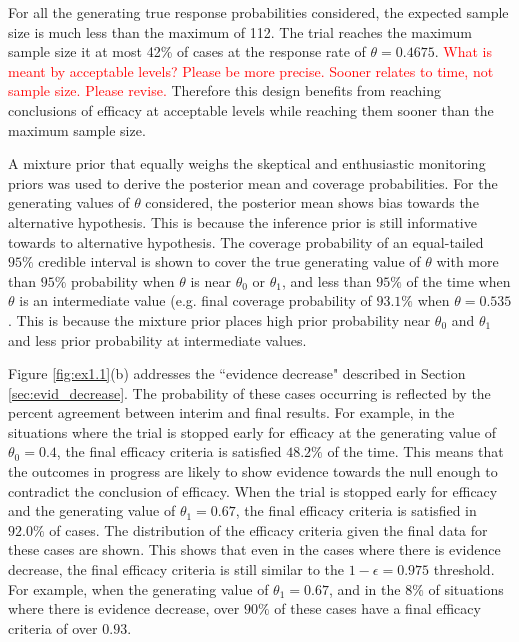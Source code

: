 \documentclass[useAMS,usenatbib,referee]{biom}
\begin{document}
For all the generating true response probabilities considered, the expected sample size is much less than the maximum of 112. The trial reaches the maximum sample size it at most 42\% of cases at the response rate of $\theta=0.4675$. 
\textcolor{red}{What is meant by acceptable levels? Please be more precise. Sooner relates to time, not sample size. Please revise.}
%
Therefore this design benefits from reaching conclusions of efficacy at acceptable levels while reaching them sooner than the maximum sample size.

A mixture prior that equally weighs the skeptical and enthusiastic monitoring priors was used to derive the posterior mean and coverage probabilities. For the generating values of $\theta$ considered, the posterior mean shows bias towards the alternative hypothesis. This is because the inference prior is still informative towards to alternative hypothesis. The coverage probability of an equal-tailed $95\%$ credible interval is shown to cover the true generating value of $\theta$ with more than $95\%$ probability when $\theta$ is near $\theta_0$ or $\theta_1$, and less than $95\%$ of the time when $\theta$ is an intermediate value (e.g. final coverage probability of $93.1\%$ when $\theta=0.535$. This is because the mixture prior places high prior probability near $\theta_0$ and $\theta_1$ and less prior probability at intermediate values.

Figure \ref{fig:ex1.1}(b) addresses the ``evidence decrease" described in Section \ref{sec:evid_decrease}. The probability of these cases occurring is reflected by the percent agreement between interim and final results. For example, in the situations where the trial is stopped early for efficacy at the generating value of $\theta_0=0.4$, the final efficacy criteria is satisfied $48.2\%$ of the time. This means that the outcomes in progress are likely to show evidence towards the null enough to contradict the conclusion of efficacy. When the trial is stopped early for efficacy and the generating value of $\theta_1=0.67$, the final efficacy criteria is satisfied in $92.0\%$ of cases. The distribution of the efficacy criteria given the final data for these cases are shown. This shows that even in the cases where there is evidence decrease, the final efficacy criteria is still similar to the $1-\epsilon=0.975$ threshold. For example, when the generating value of $\theta_1=0.67$, and in the $8\%$ of situations where there is evidence decrease, over $90\%$ of these cases have a final efficacy criteria of over $0.93$.
%
\end{document}
